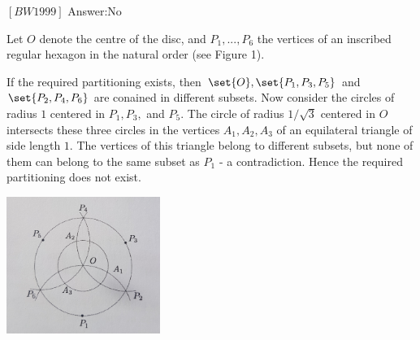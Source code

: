 \filbreak
\begin{problem}
$[BW1999]$
Answer:No

Let $O$ denote the centre of the disc, and $P_1, ... , P_6$ the vertices of an inscribed regular hexagon in the natural order (see Figure 1).

If the required partitioning exists, then $\set{O}, \set{P_1, P_3, P_5}$  and $\set{P_2,P_4, P_6}$ are conained in different subsets. Now consider the circles of radius $1$ centered in $P_1, P_3,$ and $P_5$. The circle of radius $1/\sqrt{3}$ centered in $O$ intersects these three circles in the vertices $A_1, A_2, A_3$ of an equilateral triangle of side length $1$. The vertices of this triangle belong to different subsets, but none of them can belong to the same subset as $P_1$ - a contradiction. Hence the required partitioning does not exist.
\begin{center}
\includegraphics[width=5cm]{Fig1.jpg}
\label{fig:Figure1}
\end{center}
\end{problem}



